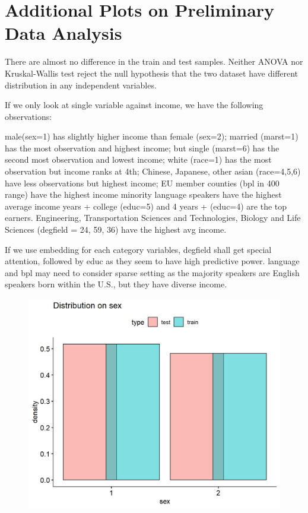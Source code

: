 \documentclass[11pt, letter,twocolumn]{article}
\begin{document}
\FloatBarrier
\printbibliography 
\newpage
\appendix
\section{Additional Plots on Preliminary Data Analysis}
There are almost no difference in the train and test samples. Neither ANOVA nor Kruskal-Wallis test reject the null hypothesis that the two dataset have different distribution in any independent variables.

 If we only look at single variable against income, we have the following observations:
\begin{outline}
	\1 male(sex=1) has slightly higher income than female (sex=2);
	\1 married (marst=1) has the most observation and highest income; but single (marst=6) has the second most observation and lowest income;
	\1 white (race=1) has the most observation but income ranks at 4th; Chinese, Japanese, other asian (race=4,5,6) have less observations but highest income; 
	\1 EU member counties (bpl in 400 range) have the highest income
	\1 minority language speakers have the highest average income
	 years + college (educ=5) and 4 years + (educ=4) are the top earners.
	\1 Engineering, Transportation Sciences and Technologies, Biology and Life Sciences (degfield = 24, 59, 36) have the highest avg income.
\end{outline}

If we use embedding for each category variables, degfield shall get special attention, followed by educ as they seem to have high predictive power. language and bpl may need to consider sparse setting as the majority speakers are English speakers born within the U.S., but they have diverse income.

\begin{figure}[ht]
	\centering
	\label{fig:unnamed-chunk-7-1}
	\includegraphics[width=0.9\linewidth]{imgs/preliminary_analysis/unnamed-chunk-7-1}
\end{figure}
\end{document}
